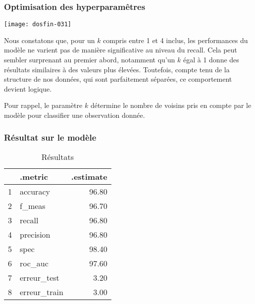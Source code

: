 \documentclass[a4paper,11pt]{article}
\begin{document}
\subsubsection{Optimisation des hyperparamêtres}



\begin{center}

\texttt{[image: dosfin-031]}

\end{center}

Nous constatons que, pour un $k$ compris entre 1 et 4 inclus, les performances du modèle ne varient pas de manière significative au niveau du recall. Cela peut sembler surprenant au premier abord, notamment qu’un $k$ égal à 1 donne des résultats similaires à des valeurs plus élevées. Toutefois, compte tenu de la structure de nos données, qui sont parfaitement séparées, ce comportement devient logique.

Pour rappel, le paramètre $k$ détermine le nombre de voisins pris en compte par le modèle pour classifier une observation donnée.

\newpage

\subsubsection{Résultat sur le modèle}

\begin{center}


\begin{table}[ht]
\centering
\begin{tabular}{rlr}
  \hline
 & .metric & .estimate \\ 
  \hline
1 & accuracy & 96.80 \\ 
  2 & f\_meas & 96.70 \\ 
  3 & recall & 96.80 \\ 
  4 & precision & 96.80 \\ 
  5 & spec & 98.40 \\ 
  6 & roc\_auc & 97.60 \\ 
  7 & erreur\_test & 3.20 \\ 
  8 & erreur\_train & 3.00 \\ 
   \hline
\end{tabular}
\caption{Résultats} 
\end{table}
\end{center}
\end{document}
